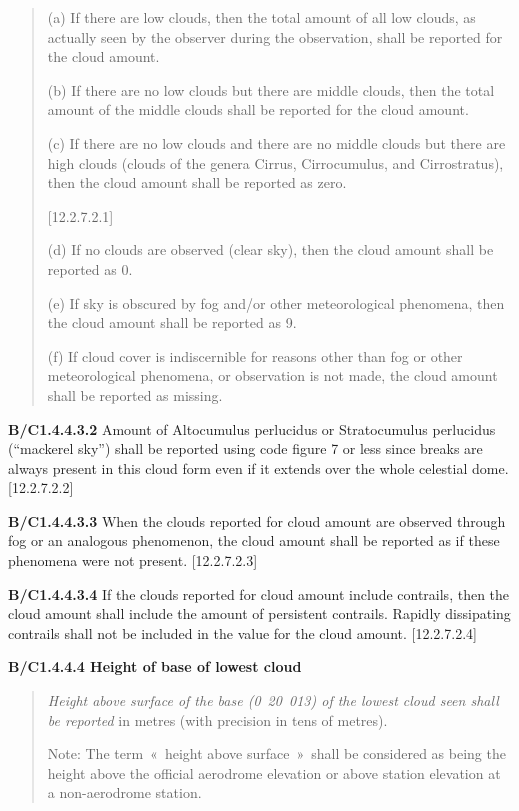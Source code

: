 \begin{quote}
(a) If there are low clouds, then the total amount of all low clouds, as actually seen by the observer during the observation, shall be reported for the cloud amount.

(b) If there are no low clouds but there are middle clouds, then the total amount of the middle clouds shall be reported for the cloud amount.

(c) If there are no low clouds and there are no middle clouds but there are high clouds (clouds of the genera Cirrus, Cirrocumulus, and Cirrostratus), then the cloud amount shall be reported as zero.

{[}12.2.7.2.1{]}

(d) If no clouds are observed (clear sky), then the cloud amount shall be reported as 0.

(e) If sky is obscured by fog and/or other meteorological phenomena, then the cloud amount shall be reported as 9.

(f) If cloud cover is indiscernible for reasons other than fog or other meteorological phenomena, or observation is not made, the cloud amount shall be reported as missing.
\end{quote}

\textbf{B/C1.4.4.3.2} Amount of Altocumulus perlucidus or Stratocumulus perlucidus (``mackerel sky'') shall be reported using code figure 7 or less since breaks are always present in this cloud form even if it extends over the whole celestial dome. {[}12.2.7.2.2{]}

\textbf{B/C1.4.4.3.3} When the clouds reported for cloud amount are observed through fog or an analogous phenomenon, the cloud amount shall be reported as if these phenomena were not present. {[}12.2.7.2.3{]}

\textbf{B/C1.4.4.3.4} If the clouds reported for cloud amount include contrails, then the cloud amount shall include the amount of persistent contrails. Rapidly dissipating contrails shall not be included in the value for the cloud amount. {[}12.2.7.2.4{]}

\textbf{B/C1.4.4.4 Height of base of lowest cloud}

\begin{quote}
\emph{Height above surface of the base (0}~\emph{20~013) of the lowest cloud seen shall be reported} in metres (with precision in tens of metres).

Note: The term~«~height above surface~»~shall be considered as being the height above the official aerodrome elevation or above station elevation at a non-aerodrome station.
\end{quote}

